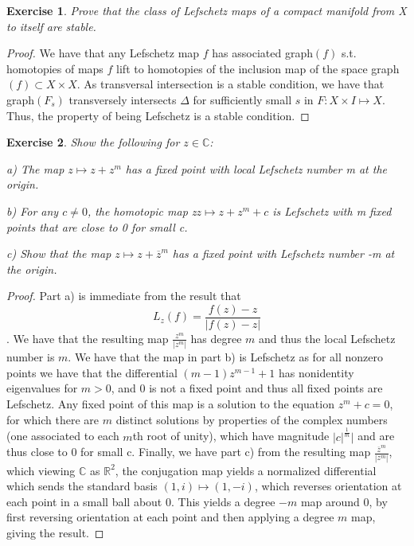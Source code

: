 \documentclass{article}
\newtheorem{exercise}{Exercise}
\begin{document}
\begin{exercise}
Prove that the class of Lefschetz maps of a compact manifold from X to itself are stable.   
\end{exercise}

\begin{proof}
  We have that any Lefschetz map $f$ has associated graph$(f)$ s.t. homotopies of maps $f$ lift to homotopies of the inclusion map of the space graph$(f) \subset X \times X$. As transversal intersection is a stable condition, we have that graph$(F_{s})$ transversely intersects $\Delta$ for sufficiently small $s$ in $F:X \times I \mapsto X$. Thus, the property of being Lefschetz is a stable condition. 
\end{proof}
\begin{exercise}
  Show the following for $z \in \mathbb{C}$:

  a) The map $z \mapsto z + z^{m}$ has a fixed point with local Lefschetz number m at the origin.

  b) For any $c \neq 0$, the homotopic map z$z \mapsto z + z^{m} + c$ is Lefschetz with m fixed points that are close to 0 for small c.

  c) Show that the map $z \mapsto z + \overline{z}^{m}$ has a fixed point with Lefschetz number -m at the origin.
\end{exercise}

\begin{proof}
  Part a) is immediate from the result that \[ L_{z}(f) = \frac{f(z)-z}{|f(z) - z|} \]. We have that the resulting map $\frac{z^{m}}{|z^{m}|}$ has degree $m$ and thus the local Lefschetz number is $m$. We have that the map in part b) is Lefschetz as for all nonzero points we have that the differential $(m-1)z^{m-1} + 1$ has nonidentity eigenvalues for $m>0$, and 0 is not a fixed point and thus all fixed points are Lefschetz. Any fixed point of this map is a solution to the equation $z^{m} + c = 0$, for which there are $m$ distinct solutions by properties of the complex numbers (one associated to each $m$th root of unity), which have magnitude $|c|^{\frac{1}{m}}|$ and are thus close to 0 for small c. Finally, we have part c) from the resulting map $\frac{\overline{z}^{m}}{|z^{m}|}$, which viewing $\mathbb{C}$ as $\mathbb{R}^{2}$, the conjugation map yields a normalized differential which sends the standard basis $(1, i) \mapsto (1, -i)$, which reverses orientation at each point in a small ball about 0. This yields a degree $-m$ map around 0, by first reversing orientation at each point and then applying a degree $m$ map, giving the result. 
\end{proof}
\end{document}
